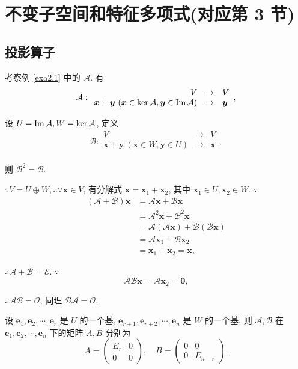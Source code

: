 \documentclass{ctexart}
\begin{document}
\section{不变子空间和特征多项式(对应第 3 节)}
\subsection{投影算子}
考察例 \ref{exa2.1} 中的 $\mathcal{A}$. 有
\[\mathcal{A}:\begin{array}{rcl}
    V & \to & V \\
    \boldsymbol{x}+\boldsymbol{y}\ (\boldsymbol{x}\in\ker\mathcal{A},\boldsymbol{y}\in\im \mathcal{A}) & \to & \boldsymbol{y} \\
\end{array},\]

设 $U=\operatorname{Im} \mathcal{A},W=\ker\mathcal{A}$, 定义
\[\mathcal{B}:\begin{array}{rcl}
    V & \to & V \\
    \boldsymbol{x}+\boldsymbol{y}\ (\boldsymbol{x}\in W,\boldsymbol{y}\in U) & \to & \boldsymbol{x} \\
\end{array},\]

则 $\mathcal{B}^2=\mathcal{B}$.

$\because V=U\oplus W,\therefore\forall\boldsymbol{x}\in V$, 有分解式 $\boldsymbol{x}=\boldsymbol{x}_1+\boldsymbol{x}_2$, 其中 $\boldsymbol{x}_1\in U,\boldsymbol{x}_2\in W$. $\because$
\begin{align*}
    (\mathcal{A}+\mathcal{B})\boldsymbol{x} & =\mathcal{A}\boldsymbol{x}+\mathcal{B}\boldsymbol{x} \\
    & =\mathcal{A}^2\boldsymbol{x}+\mathcal{B}^2\boldsymbol{x} \\
    & =\mathcal{A}(\mathcal{A}\boldsymbol{x})+\mathcal{B}(\mathcal{B}\boldsymbol{x}) \\
    & =\mathcal{A}\boldsymbol{x}_1+\mathcal{B}\boldsymbol{x}_2 \\
    & =\boldsymbol{x}_1+\boldsymbol{x}_2=\boldsymbol{x},
\end{align*}

$\therefore\mathcal{A}+\mathcal{B}=\mathcal{E}$. $\because$
\[\mathcal{A}\mathcal{B}\boldsymbol{x}=\mathcal{A}\boldsymbol{x}_2=\boldsymbol{0},\]

$\therefore\mathcal{A}\mathcal{B}=\mathcal{O}$, 同理 $\mathcal{B}\mathcal{A}=\mathcal{O}$.

设 $\boldsymbol{e}_1,\boldsymbol{e}_2,\cdots,\boldsymbol{e}_r$ 是 $U$ 的一个基, $\boldsymbol{e}_{r+1},\boldsymbol{e}_{r+2},\cdots,\boldsymbol{e}_n$ 是 $W$ 的一个基, 则 $\mathcal{A},\mathcal{B}$ 在 $\boldsymbol{e}_1,\boldsymbol{e}_2,\cdots,\boldsymbol{e}_n$ 下的矩阵 $A,B$ 分别为
\[A=\begin{pmatrix}
    E_r & 0 \\
    0 & 0
\end{pmatrix},\quad B=\begin{pmatrix}
    0 & 0 \\
    0 & E_{n-r}
\end{pmatrix}.\]
\end{document}
